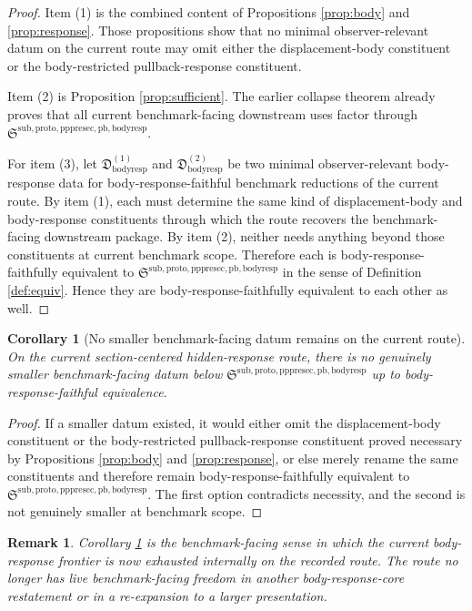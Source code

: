 \documentclass[11pt]{article}
\newcommand{\PullbackBodyResponseCore}{\mathfrak S^{\mathrm{sub,proto,pppresec,pb,bodyresp}}}
\newcommand{\BodyResponseDatum}{\mathfrak D_{\mathrm{bodyresp}}}
\newtheorem{remark}{Remark}
\newtheorem{corollary}{Corollary}
\begin{document}
\begin{proof}
Item (1) is the combined content of Propositions \ref{prop:body} and \ref{prop:response}. Those propositions show that no minimal observer-relevant datum on the current route may omit either the displacement-body constituent or the body-restricted pullback-response constituent.

Item (2) is Proposition \ref{prop:sufficient}. The earlier collapse theorem already proves that all current benchmark-facing downstream uses factor through \(\PullbackBodyResponseCore\).

For item (3), let \(\BodyResponseDatum^{(1)}\) and \(\BodyResponseDatum^{(2)}\) be two minimal observer-relevant body-response data for body-response-faithful benchmark reductions of the current route. By item (1), each must determine the same kind of displacement-body and body-response constituents through which the route recovers the benchmark-facing downstream package. By item (2), neither needs anything beyond those constituents at current benchmark scope. Therefore each is body-response-faithfully equivalent to \(\PullbackBodyResponseCore\) in the sense of Definition \ref{def:equiv}. Hence they are body-response-faithfully equivalent to each other as well.
\end{proof}

\begin{corollary}[No smaller benchmark-facing datum remains on the current route]
\label{cor:minimal}
On the current section-centered hidden-response route, there is no genuinely smaller benchmark-facing datum below \(\PullbackBodyResponseCore\) up to body-response-faithful equivalence.
\end{corollary}

\begin{proof}
If a smaller datum existed, it would either omit the displacement-body constituent or the body-restricted pullback-response constituent proved necessary by Propositions \ref{prop:body} and \ref{prop:response}, or else merely rename the same constituents and therefore remain body-response-faithfully equivalent to \(\PullbackBodyResponseCore\). The first option contradicts necessity, and the second is not genuinely smaller at benchmark scope.
\end{proof}

\begin{remark}
Corollary \ref{cor:minimal} is the benchmark-facing sense in which the current body-response frontier is now exhausted internally on the recorded route. The route no longer has live benchmark-facing freedom in another body-response-core restatement or in a re-expansion to a larger presentation.
\end{remark}
\end{document}
